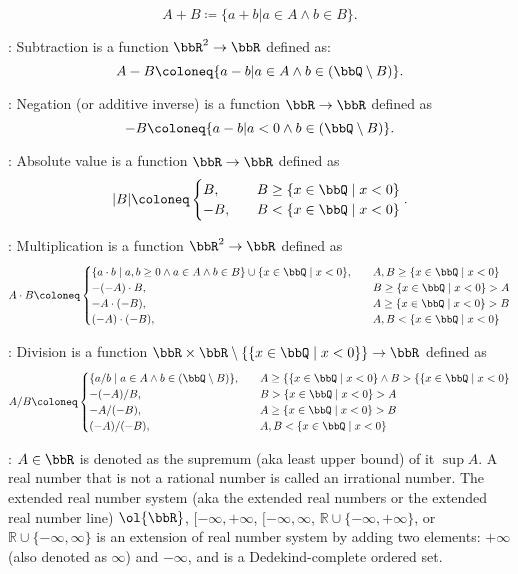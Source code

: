 \documentclass[a4paper,12pt]{report}
\begin{document}
\begin{itemizle}
\[A+B\coloneq\{a+b|a\in A\land b\in B\}.\]
\item {}: Subtraction is a function $\bbR^2\to\bbR$ defined as:
\[A-B\coloneq\{a-b|a\in A\land b\in(\bbQ\setminus B)\}.\]
\item {}: Negation (or additive inverse) is a function $\bbR\to\bbR$ defined as
\[-B\coloneq\{a-b|a<0\land b\in(\bbQ\setminus B)\}.\]
\item {}: Absolute value is a function $\bbR\to\bbR$ defined as
\[|B|\coloneq\begin{cases}
B,\quad&B\geq\{x\in\bbQ\mid x<0\}\\
-B,\quad&B<\{x\in\bbQ\mid x<0\}
\end{cases}.\]
\item {}: Multiplication is a function $\bbR^2\to\bbR$ defined as
\[A\cdot B\coloneq\begin{cases}
\{a\cdot b\mid a,b\geq 0\land a\in A\land b\in B\}\cup\{x\in\bbQ\mid x<0\},\quad&A,B\geq\{x\in\bbQ\mid x<0\}\\
-(-A)\cdot B,\quad&B\geq\{x\in\bbQ\mid x<0\}>A\\
-A\cdot (-B),\quad&A\geq\{x\in\bbQ\mid x<0\}>B\\
(-A)\cdot (-B),\quad&A,B<\{x\in\bbQ\mid x<0\}
\end{cases}\]
\item {}: Division is a function $\bbR\times\bbR\setminus\{\{x\in\bbQ\mid x<0\}\}\to\bbR$ defined as
\[A/B\coloneq\begin{cases}
\{a/b\mid a\in A\land b\in(\bbQ\setminus B)\},\quad&A\geq\{\{x\in\bbQ\mid x<0\}\land B>\{\{x\in\bbQ\mid x<0\}\\
-(-A)/B,\quad&B>\{x\in\bbQ\mid x<0\}>A\\
-A/(-B),\quad&A\geq\{x\in\bbQ\mid x<0\}>B\\
(-A)/(-B),\quad&A,B<\{x\in\bbQ\mid x<0\}
\end{cases}\]
\item {}: $A\in\bbR$ is denoted as the supremum (aka least upper bound) of it $\sup A$.
\eit
{}
A real number that is not a rational number is called an irrational number.
The extended real number system (aka the extended real numbers or the extended real number line) $\ol{\bbR}$, $[-\infty,+\infty$, $[-\infty,\infty$, $\mathbb{R}\cup\{-\infty,+\infty\}$, or $\mathbb{R}\cup\{-\infty,\infty\}$ is an extension of real number system by adding two elements: $+\infty$ (also denoted as $\infty$) and $-\infty$, and is a Dedekind-complete ordered set.

\end{itemizle}
\end{document}
